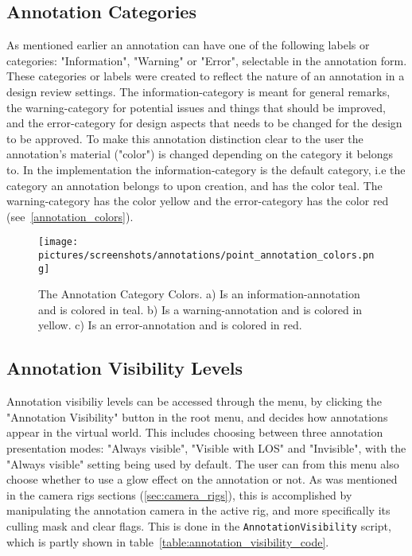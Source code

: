 
\subsection{Annotation Categories}
As mentioned earlier an annotation can have one of the following labels or categories: "Information", "Warning" or "Error", selectable in the annotation form.
These categories or labels were created to reflect the nature of an annotation in a design review settings. 
The information-category is meant for general remarks, the warning-category for potential issues and things that should be improved, and the
error-category for design aspects that needs to be changed for the design to be approved. To make this annotation distinction clear to the user
the annotation's material ("color") is changed depending on the category it belongs to. In the implementation the information-category is
the default category, i.e the category an annotation belongs to upon creation, and has the color teal. The warning-category has the color yellow and
the error-category has the color red (see~\vref{annotation_colors}).

\begin{figure}%
	\texttt{[image: pictures/screenshots/annotations/point\_annotation\_colors.png]}
	\caption[The Annotation Category Colors]{The Annotation Category Colors. a) Is an information-annotation and is colored in teal. 
			b) Is a warning-annotation and is colored in yellow. c) Is an error-annotation and is colored in red.}
	\label{fig:annotation_colors}
\end{figure} 

\subsection{Annotation Visibility Levels}
\label{sec:annotations}
Annotation visibiliy levels can be accessed through the menu, by clicking the "Annotation Visibility" button in the root menu, 
and decides how annotations appear in the virtual world. This includes choosing between three annotation presentation modes: "Always visible", "Visible with LOS" and 
"Invisible", with the "Always visible" setting being used by default. 
The user can from this menu also choose whether to use a glow effect on the annotation or not. 
As was mentioned in the camera rigs sections (\ref{sec:camera_rigs}), this is 
accomplished by manipulating the annotation camera in the active rig, and more specifically its culling mask and clear flags. 
This is done in the \texttt{AnnotationVisibility} script, which is partly shown in table~\vref{table:annotation_visibility_code}.

